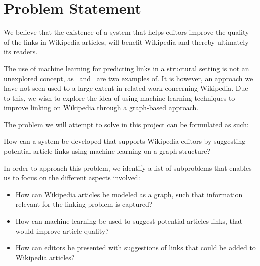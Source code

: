 \section{Problem Statement}\label{sec:problem_statement}
We believe that the existence of a system that helps editors improve the quality of the links in Wikipedia articles, will benefit Wikipedia and thereby ultimately its readers.

The use of machine learning for predicting links in a structural setting is not an unexplored concept, as~\cite{tang2015line} and~\cite{al2006link} are two examples of. It is however, an approach we have not seen used to a large extent in related work concerning Wikipedia. Due to this, we wish to explore the idea of using machine learning techniques to improve linking on Wikipedia through a graph-based approach.

The problem we will attempt to solve in this project can be formulated as such:
\vspace{1ex} %
\begin{formal}
How can a system be developed that supports Wikipedia editors by suggesting potential article links using machine learning on a graph structure?
\end{formal}

In order to approach this problem, we identify a list of subproblems that enables us to focus on the different aspects involved:

\begin{itemize}
  \item How can Wikipedia articles be modeled as a graph, such that information relevant for the linking problem is captured?
  \item How can machine learning be used to suggest potential articles links, that would improve article quality?
  \item How can editors be presented with suggestions of links that could be added to Wikipedia articles?
\end{itemize}


